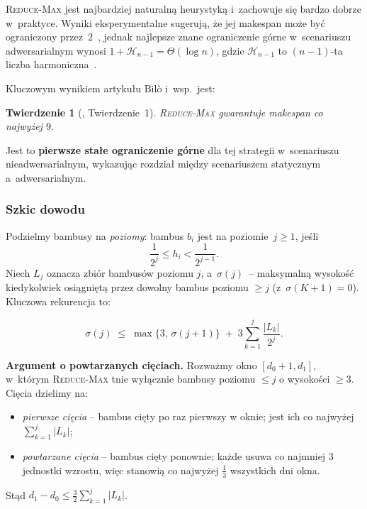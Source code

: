 \documentclass[12pt,a4paper]{article}
\theoremstyle{plain}
\newtheorem{twierdzenie}{Twierdzenie}[section]
\theoremstyle{definition}
\theoremstyle{remark}
\newcommand{\RM}{\textsc{Reduce-Max}}
\begin{document}
\RM{} jest najbardziej naturalną heurystyką i~zachowuje się bardzo dobrze
w~praktyce. Wyniki eksperymentalne sugerują, że jej makespan może być
ograniczony przez~$2$~\cite{demidio2019}, jednak najlepsze znane ograniczenie
górne w~scenariuszu adwersarialnym wynosi
$1 + \mathcal{H}_{n-1} = \Theta(\log n)$, gdzie $\mathcal{H}_{n-1}$
to $(n-1)$-ta liczba harmoniczna~\cite{bodlaender2012}.

Kluczowym wynikiem artykułu Bilò i~wsp.\ jest:

\begin{twierdzenie}[\cite{bilo2022}, Twierdzenie~1]\label{thm:rm}
\RM{} gwarantuje makespan co najwyżej $9$.
\end{twierdzenie}

Jest to \textbf{pierwsze stałe ograniczenie górne} dla tej strategii
w~scenariuszu nieadwersarialnym, wykazując rozdział między scenariuszem
statycznym a~adwersarialnym.

\subsubsection{Szkic dowodu}

Podzielmy bambusy na \emph{poziomy}: bambus $b_i$ jest na poziomie~$j\geq 1$,
jeśli
\[
  \frac{1}{2^j} \leq h_i < \frac{1}{2^{j-1}}.
\]
Niech $L_j$ oznacza zbiór bambusów poziomu $j$, a~$\sigma(j)$~– maksymalną
wysokość kiedykolwiek osiągniętą przez dowolny bambus poziomu $\geq j$
(z~$\sigma(K+1) = 0$). Kluczowa rekurencja to:

\begin{equation}\label{eq:recurrence}
  \sigma(j) \;\leq\; \max\!\bigl\{3,\,\sigma(j+1)\bigr\}
             \;+\; 3\sum_{k=1}^{j} \frac{|L_k|}{2^j}.
\end{equation}

\textbf{Argument o powtarzanych cięciach.} Rozważmy okno $[d_0+1, d_1]$,
w~którym \RM{} tnie wyłącznie bambusy poziomu $\leq j$ o wysokości $\geq 3$.
Cięcia dzielimy na:
\begin{itemize}[noitemsep]
  \item \emph{pierwsze cięcia} – bambus cięty po raz pierwszy w oknie;
        jest ich co najwyżej $\sum_{k=1}^{j}|L_k|$;
  \item \emph{powtarzane cięcia} – bambus cięty ponownie; każde usuwa
        co najmniej $3$ jednostki wzrostu, więc stanowią co najwyżej
        $\tfrac{1}{3}$ wszystkich dni okna.
\end{itemize}
Stąd $d_1 - d_0 \leq \tfrac{3}{2}\sum_{k=1}^{j}|L_k|$.
\end{document}
